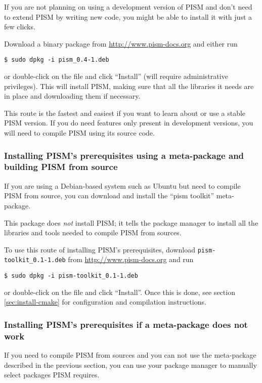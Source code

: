 \documentclass[11pt,final]{amsart}
\begin{document}
If you are not planning on using a development version of PISM and don't need to extend PISM by writing new code, you might be
able to install it with just a few clicks.

Download a binary package from \url{http://www.pism-docs.org} and either run
\begin{verbatim}
$ sudo dpkg -i pism_0.4-1.deb
\end{verbatim}%
or double-click on the file and click ``Install'' (will require administrative privileges). This will install PISM, making sure that
all the libraries it needs are in place and downloading them if necessary.

This route is the fastest and easiest if you want to learn about or use a stable PISM version. If you do need features only
present in development versions, you will need to compile PISM using its source code.

\subsubsection{Installing PISM's prerequisites using a meta-package and building PISM from source}
\label{sec:deb-pism-toolkit}

If you are using a Debian-based system such as Ubuntu but need to compile PISM from source, you can download and install the
``pism toolkit'' meta-package.

This package does \emph{not} install PISM; it tells the package manager to install all the libraries and tools needed to compile
PISM from sources.

To use this route of installing PISM's prerequisites, download \texttt{pism-toolkit_0.1-1.deb} from \url{http://www.pism-docs.org} and run
\begin{verbatim}
$ sudo dpkg -i pism-toolkit_0.1-1.deb
\end{verbatim}%
or double-click on the file and click ``Install''. Once this is done, see section \ref{sec:install-cmake} for configuration and
compilation instructions.

\subsubsection{Installing PISM's prerequisites if a meta-package does not work}
\label{sec:deb-libraries-by-hand}

If you need to compile PISM from sources and you can not use the meta-package described in the previous section, you can use your
package manager to manually select packages PISM requires.
\end{document}
